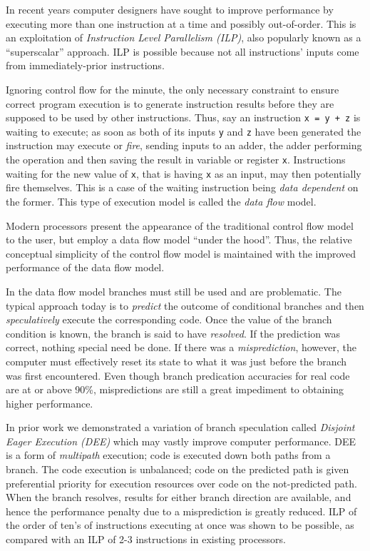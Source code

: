 \documentclass[10pt,dvips]{article}
\begin{document}
In recent years computer designers have sought to improve performance by
executing more than one instruction at a time and possibly out-of-order. This is
an exploitation of {\it Instruction Level Parallelism (ILP)}, also popularly known
as a ``superscalar'' approach. ILP is possible because not all instructions' inputs
come from immediately-prior instructions.

Ignoring control flow for the minute, the
only necessary constraint to ensure correct program execution is to generate instruction
results before they are supposed to be used by other instructions. Thus, say an
instruction {\tt x = y + z} is waiting to execute; as soon as both of its inputs
{\tt y} and {\tt z} have been generated the instruction may execute or {\it fire},
sending inputs to an adder, the adder performing the operation and then saving
the result in variable or register {\tt x}. Instructions waiting for the new value
of {\tt x}, that is having {\tt x} as an input, may then potentially fire themselves.
This is a case of the waiting instruction being {\it data dependent} on the former.
This type of execution model is called the {\it data flow} model.

Modern processors present the appearance of the traditional control flow model to
the user, but employ a data flow model ``under the hood''. Thus, the relative
conceptual
simplicity of the control flow model is maintained with the improved performance of
the data flow model.

In the data flow model branches must still be used and are problematic. The typical
approach today is to {\it predict} the outcome of conditional branches and then
{\it speculatively} execute the corresponding code. Once the value of the
branch condition is known, the branch is said to have {\it resolved}. If the
prediction was correct, nothing special need be done. If there was a
{\it misprediction}, however, the computer must effectively reset its state to
what it was just before the branch was first encountered. Even though
branch predication accuracies for real code are at or above 90\%, mispredictions
are still a great impediment to obtaining higher performance.

In prior work\cite{Uht95} we demonstrated a variation of branch speculation called
{\it Disjoint Eager Execution (DEE)} which may vastly improve computer performance.
DEE is a form of {\it multipath} execution; code is executed down both paths from
a branch. The code execution is unbalanced; code on the predicted path is given
preferential priority for execution resources over code on the not-predicted path.
When the branch resolves, results for either branch direction are available,
and hence the performance penalty due to a misprediction is greatly reduced.
ILP of the order of ten's of instructions executing at once was shown to be
possible, as compared with an ILP of 2-3 instructions in existing processors.
\end{document}
